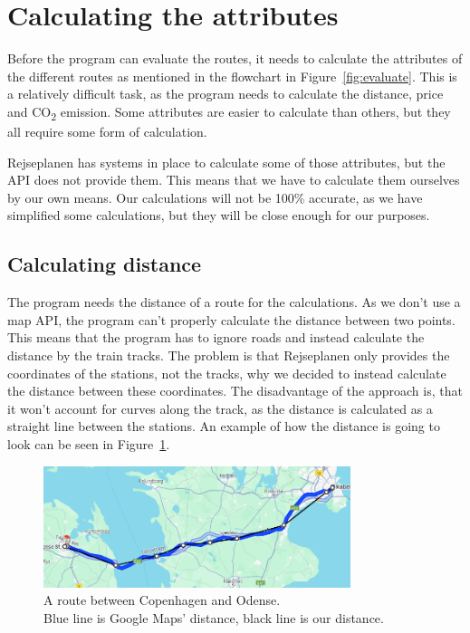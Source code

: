 \section{Calculating the attributes}\label{sec:calculations}

Before the program can evaluate the routes, it needs to calculate the attributes of the different routes as mentioned in
the flowchart in Figure~\ref{fig:evaluate}.
This is a relatively difficult task, as the program needs to calculate the distance, price and \unit{CO_{2}} emission.
Some attributes are easier to calculate than others, but they all require some form of calculation.

Rejseplanen has systems in place to calculate some of those attributes, but the API does not provide them.
This means that we have to calculate them ourselves by our own means.
Our calculations will not be 100\% accurate, as we have simplified some calculations, but they will be close
enough for our purposes.

\subsection{Calculating distance}\label{subsec:calculating-distance}

The program needs the distance of a route for the calculations.
As we don't use a map API, the program can't properly calculate the distance between two points.
This means that the program has to ignore roads and instead calculate the distance by the train tracks.
The problem is that Rejseplanen only provides the coordinates of the stations, not the tracks, why we decided to instead
calculate the distance between these coordinates.
The disadvantage of the approach is, that it won't account for curves along the track, as the distance is calculated as
a straight line between the stations.
An example of how the distance is going to look can be seen in Figure~\ref{fig:image-google-maps-distance-calculation}.

\begin{figure}[H]
    \centering
    \includegraphics[width=0.8\textwidth]{images/google-maps-distance-calculation}
    \caption{A route between Copenhagen and Odense. \\ Blue line is Google Maps' distance, black line is our distance.}
    \label{fig:image-google-maps-distance-calculation}
\end{figure}

